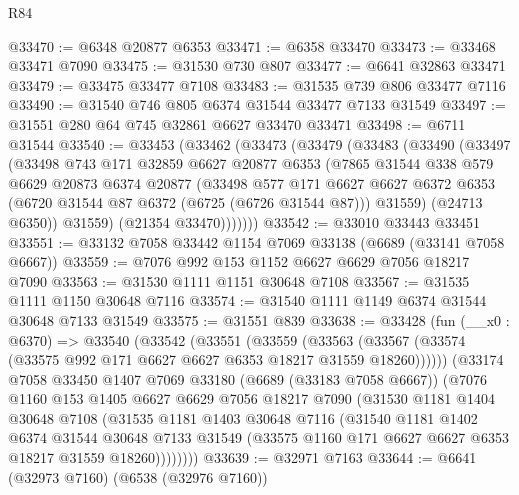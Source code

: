 \begin{lexlean}{R84}
\begin{coremodule}
@33470 := @6348 @20877 @6353
@33471 := @6358 @33470
@33473 := @33468 @33471 @7090
@33475 := @31530 @730 @807
@33477 := @6641 @32863 @33471
@33479 := @33475 @33477 @7108
@33483 := @31535 @739 @806 @33477 @7116
@33490 := @31540 @746 @805 @6374 @31544 @33477 @7133 @31549
@33497 := @31551 @280 @64 @745 @32861 @6627 @33470 @33471
@33498 := @6711 @31544
@33540 := @33453
    (@33462
      (@33473
        (@33479
          (@33483
            (@33490
              (@33497
                (@33498
                  @743
                  @171
                  @32859
                  @6627
                  @20877
                  @6353
                  (@7865
                    @31544
                    @338
                    @579
                    @6629
                    @20873
                    @6374
                    @20877
                    (@33498
                      @577
                      @171
                      @6627
                      @6627
                      @6372
                      @6353
                      (@6720 @31544 @87 @6372 (@6725 (@6726 @31544 @87)))
                      @31559)
                    (@24713 @6350))
                  @31559)
                (@21354 @33470)))))))
@33542 := @33010 @33443 @33451
@33551 := @33132 @7058 @33442 @1154 @7069 @33138 (@6689 (@33141 @7058 @6667))
@33559 := @7076 @992 @153 @1152 @6627 @6629 @7056 @18217 @7090
@33563 := @31530 @1111 @1151 @30648 @7108
@33567 := @31535 @1111 @1150 @30648 @7116
@33574 := @31540 @1111 @1149 @6374 @31544 @30648 @7133 @31549
@33575 := @31551 @839
@33638 := @33428
    (fun (__x0 : @6370) =>
    @33540
      (@33542
        (@33551
          (@33559
            (@33563 (@33567 (@33574 (@33575 @992 @171 @6627 @6627 @6353 @18217 @31559 @18260))))))
        (@33174
          @7058
          @33450
          @1407
          @7069
          @33180
          (@6689 (@33183 @7058 @6667))
          (@7076
            @1160
            @153
            @1405
            @6627
            @6629
            @7056
            @18217
            @7090
            (@31530
              @1181
              @1404
              @30648
              @7108
              (@31535
                @1181
                @1403
                @30648
                @7116
                (@31540
                  @1181
                  @1402
                  @6374
                  @31544
                  @30648
                  @7133
                  @31549
                  (@33575 @1160 @171 @6627 @6627 @6353 @18217 @31559 @18260))))))))
@33639 := @32971 @7163
@33644 := @6641 (@32973 @7160) (@6538 (@32976 @7160))

\end{coremodule}
\end{lexlean}
